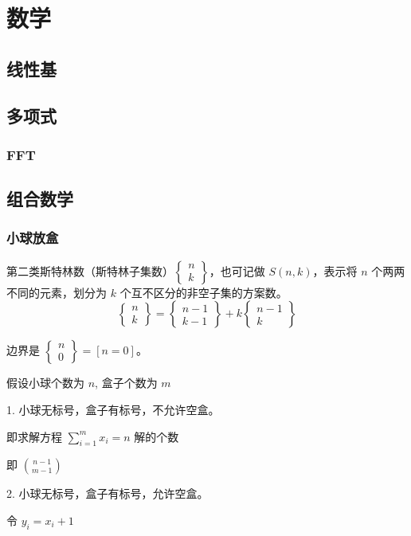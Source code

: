 \documentclass[a4paper]{article}
\begin{document}
\section{数学}
\subsection{线性基}

\subsection{多项式}
\subsubsection{FFT}

\subsection{组合数学}
\subsubsection{小球放盒}
第二类斯特林数（斯特林子集数）$\begin{Bmatrix}n\\ k\end{Bmatrix}$，也可记做 $S(n,k)$，表示将 $n$ 个两两不同的元素，划分为 $k$ 个互不区分的非空子集的方案数。
$$
\begin{Bmatrix}n\\ k\end{Bmatrix}=\begin{Bmatrix}n-1\\ k-1\end{Bmatrix}+k\begin{Bmatrix}n-1\\ k\end{Bmatrix}
$$

边界是 $\begin{Bmatrix}n\\ 0\end{Bmatrix}=[n=0]$。

假设小球个数为 $n$, 盒子个数为 $m$

1. 小球无标号，盒子有标号，不允许空盒。

   即求解方程 $\sum\limits_{i=1}^mx_i=n$ 解的个数

   即 $\binom{n-1}{m-1}$

2. 小球无标号，盒子有标号，允许空盒。

   令 $y_i=x_i+1$
\end{document}
